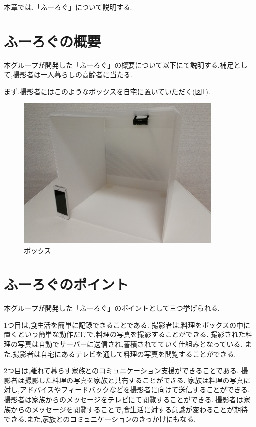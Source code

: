 \documentclass[../report]{subfiles}
\begin{document}
本章では,「ふーろぐ」について説明する.

\section{ふーろぐの概要}
本グループが開発した「ふーろぐ」の概要について以下にて説明する.補足として,撮影者は一人暮らしの高齢者に当たる.

まず,撮影者にはこのようなボックスを自宅に置いていただく(図\ref{fig:box}).
\begin{figure}[htbp]
    \begin{center}
        \includegraphics[width=10cm]{imgs/5_box.jpg}
        \caption{ボックス}
        \label{fig:box}
    \end{center}
\end{figure}

\section{ふーろぐのポイント}
本グループが開発した「ふーろぐ」のポイントとして三つ挙げられる.

1つ目は,食生活を簡単に記録できることである.
撮影者は,料理をボックスの中に置くという簡単な動作だけで,料理の写真を撮影することができる.
撮影された料理の写真は自動でサーバーに送信され,蓄積されてていく仕組みとなっている.
また,撮影者は自宅にあるテレビを通して料理の写真を閲覧することができる.

2つ目は,離れて暮らす家族とのコミュニケーション支援ができることである.
撮影者は撮影した料理の写真を家族と共有することができる.
家族は料理の写真に対し,アドバイスやフィードバックなどを撮影者に向けて送信することができる.
撮影者は家族からのメッセージをテレビにて閲覧することができる.
撮影者は家族からのメッセージを閲覧することで,食生活に対する意識が変わることが期待できる.また,家族とのコミュニケーションのきっかけにもなる.
\end{document}
